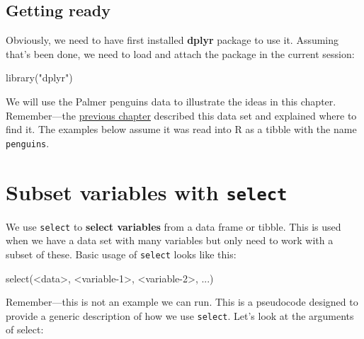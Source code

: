 \documentclass[
]{book}
\newenvironment{Shaded}{\begin{snugshade}}{\end{snugshade}}
\newcommand{\DecValTok}[1]{\textcolor[rgb]{0.00,0.00,0.81}{#1}}
\newcommand{\FunctionTok}[1]{\textcolor[rgb]{0.00,0.00,0.00}{#1}}
\newcommand{\NormalTok}[1]{#1}
\newcommand{\SpecialCharTok}[1]{\textcolor[rgb]{0.00,0.00,0.00}{#1}}
\newcommand{\StringTok}[1]{\textcolor[rgb]{0.31,0.60,0.02}{#1}}
\begin{document}
\hypertarget{getting-ready}{%
\subsection{Getting ready}\label{getting-ready}}

Obviously, we need to have first installed \textbf{dplyr} package to use it. Assuming that's been done, we need to load and attach the package in the current session:

\begin{Shaded}
\begin{Highlighting}[]
\FunctionTok{library}\NormalTok{(}\StringTok{"dplyr"}\NormalTok{)}
\end{Highlighting}
\end{Shaded}

We will use the Palmer penguins data to illustrate the ideas in this chapter. Remember---the \protect\hyperlink{penguins-data-overview}{previous chapter} described this data set and explained where to find it. The examples below assume it was read into R as a tibble with the name \texttt{penguins}.

\hypertarget{subset-variables-with-select}{%
\section{\texorpdfstring{Subset variables with \texttt{select}}{Subset variables with select}}\label{subset-variables-with-select}}

We use \texttt{select} to \textbf{select variables} from a data frame or tibble. This is used when we have a data set with many variables but only need to work with a subset of these. Basic usage of \texttt{select} looks like this:

\begin{Shaded}
\begin{Highlighting}[]
\FunctionTok{select}\NormalTok{(}\SpecialCharTok{\textless{}}\NormalTok{data}\SpecialCharTok{\textgreater{}}\NormalTok{, }\SpecialCharTok{\textless{}}\NormalTok{variable}\DecValTok{{-}1}\SpecialCharTok{\textgreater{}}\NormalTok{, }\SpecialCharTok{\textless{}}\NormalTok{variable}\DecValTok{{-}2}\SpecialCharTok{\textgreater{}}\NormalTok{, ...)}
\end{Highlighting}
\end{Shaded}

Remember---this is not an example we can run. This is a pseudocode designed to provide a generic description of how we use \texttt{select}. Let's look at the arguments of select:
\end{document}
